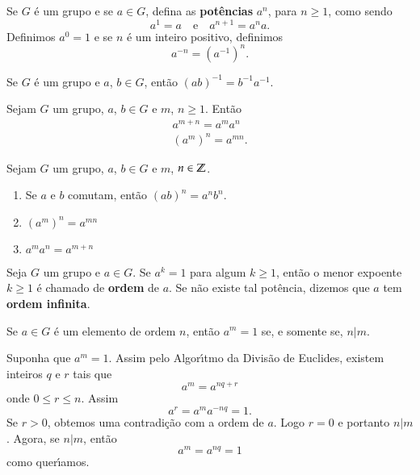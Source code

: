 \begin{definicao}
	Se $G$ \'e um grupo e se $a \in G$, defina as \textbf{pot\^encias} $a^n$, para $n \ge 1$, como sendo
	\[
		a^1 = a\quad \mbox{e}\quad a^{n + 1} = a^na.
	\]
	Definimos $a^0 = 1$ e se $n$ \'e um inteiro positivo, definimos
	\[
		a^{-n} = (a^{-1})^n.
	\]
\end{definicao}

\begin{lema}
	Se $G$ \'e um grupo e $a$, $b \in G$, ent\~ao $(ab)^{-1} = b^{-1}a^{-1}$.
\end{lema}

\begin{lema}
	Sejam $G$ um grupo, $a$, $b \in G$ e $m$, $n \ge 1$. Ent\~ao
	\begin{align*}
		a^{m + n} = a^ma^n\\
		(a^m)^n = a^{mn}.
	\end{align*}
\end{lema}

\begin{proposicao}
	Sejam $G$ um grupo, $a$, $b \in G$ e $m$, $n \in \mathbb{Z}$.
	\begin{enumerate}[label=({\roman*})]
		\item Se $a$ e $b$ comutam, ent\~ao $(ab)^n = a^nb^n$.
		\item $(a^m)^n = a^{mn}$
		\item $a^ma^n = a^{m + n}$ 
	\end{enumerate}
\end{proposicao}

\begin{definicao}
	Seja $G$ um grupo e $a \in G$. Se $a^k = 1$ para algum $k \ge 1$, ent\~ao o menor expoente $k \ge 1$ \'e chamado de \textbf{ordem} de $a$. Se n\~ao existe tal pot\^encia, dizemos que $a$ tem \textbf{ordem infinita}.
\end{definicao}

\begin{teorema}\label{ordem_elemento}
	Se $a \in G$ \'e um elemento de ordem $n$, ent\~ao $a^m = 1$ se, e somente se, $n | m$.
\end{teorema}
\begin{prova}
	Suponha que $a^m = 1$. Assim pelo Algor{\'\i}tmo da Divis\~ao de Euclides, existem inteiros $q$ e $r$ tais que
	\[
		a^m = a^{nq + r}
	\]
	onde $0 \le r \le n$. Assim
	\[
		a^r = a^ma^{-nq} = 1.
	\]
	Se $r > 0$, obtemos uma contradi\c{c}\~ao com a ordem de $a$. Logo $r = 0$ e portanto $n | m$. Agora, se $n | m$, ent\~ao
	\[
		a^m = a^{nq} = 1
	\]
	como quer{\'\i}amos.
\end{prova}

